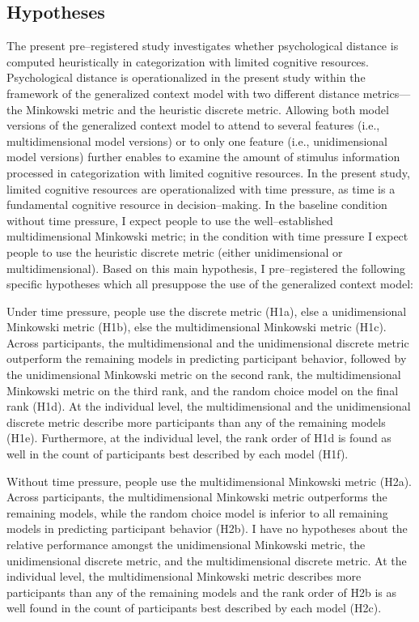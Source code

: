 \documentclass[a4paper,man,natbib]{apa6}
\begin{document}
\subsection{Hypotheses}
The present pre--registered study investigates whether psychological distance is computed heuristically in categorization with limited cognitive resources. Psychological distance is operationalized in the present study within the framework of the generalized context model \citep{nosofsky1989further} with two different distance metrics---the Minkowski metric and the heuristic discrete metric. Allowing both model versions of the generalized context model to attend to several features (i.e., multidimensional model versions) or to only one feature (i.e., unidimensional model versions) further enables to examine the amount of stimulus information processed in categorization with limited cognitive resources. In the present study, limited cognitive resources are operationalized with time pressure, as time is a fundamental cognitive resource in decision--making. In the baseline condition without time pressure, I expect people to use the well--established multidimensional Minkowski metric; in the condition with time pressure I expect people to use the heuristic discrete metric (either unidimensional or multidimensional). Based on this main hypothesis, I pre--registered the following specific hypotheses which all presuppose the use of the generalized context model: 

Under time pressure, people use the discrete metric (H1a), else a unidimensional Minkowski metric (H1b), else the multidimensional Minkowski metric (H1c). Across participants, the multidimensional and the unidimensional discrete metric outperform the remaining models in predicting participant behavior, followed by the unidimensional Minkowski metric on the second rank, the multidimensional Minkowski metric on the third rank, and the random choice model on the final rank (H1d). At the individual level, the multidimensional and the unidimensional discrete metric describe more participants than any of the remaining models (H1e). Furthermore, at the individual level, the rank order of H1d is found as well in the count of participants best described by each model (H1f). 

Without time pressure, people use the multidimensional Minkowski metric (H2a). Across participants, the multidimensional Minkowski metric outperforms the remaining models, while the random choice model is inferior to all remaining models in predicting participant behavior (H2b). I have no hypotheses about the relative performance amongst the unidimensional Minkowski metric, the unidimensional discrete metric, and the multidimensional discrete metric. At the individual level, the multidimensional Minkowski metric describes more participants than any of the remaining models and the rank order of H2b is as well found in the count of participants best described by each model (H2c). 
\end{document}
